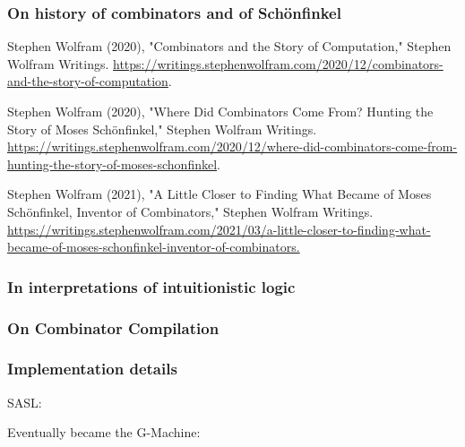 \documentclass[aspectratio=1610, xcolor={dvipsnames}]{beamer}
\begin{document}
\begin{frame}
    \frametitle{On history of combinators and of Sch\"onfinkel}

    Stephen Wolfram (2020), "Combinators and the Story of Computation," Stephen
    Wolfram Writings.
    \url{https://writings.stephenwolfram.com/2020/12/combinators-and-the-story-of-computation}.

    Stephen Wolfram (2020), "Where Did Combinators Come From? Hunting the Story
    of Moses Schönfinkel," Stephen Wolfram Writings.
    \url{https://writings.stephenwolfram.com/2020/12/where-did-combinators-come-from-hunting-the-story-of-moses-schonfinkel}.

    Stephen Wolfram (2021), "A Little Closer to Finding What Became of Moses
    Schönfinkel, Inventor of Combinators," Stephen Wolfram Writings.
    \url{https://writings.stephenwolfram.com/2021/03/a-little-closer-to-finding-what-became-of-moses-schonfinkel-inventor-of-combinators.}

\end{frame}

\begin{frame}
    \frametitle{In interpretations of intuitionistic logic}
    
    


\end{frame}

\begin{frame}
    \frametitle{On Combinator Compilation}




\end{frame}

\begin{frame}
    \frametitle{Implementation details}

    SASL:
    

    Eventually became the G-Machine:



\end{frame}
\end{document}

